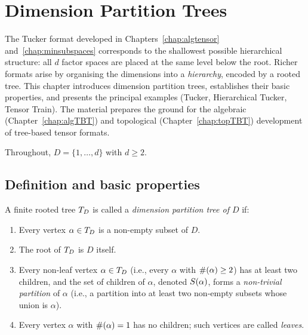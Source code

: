 %
%

\chapter{Dimension Partition Trees}
\label{chap:trees}

The Tucker format developed in Chapters~\ref{chap:algtensor}
and~\ref{chap:minsubspaces} corresponds to the shallowest possible
hierarchical structure: all $d$ factor spaces are placed at the same
level below the root. Richer formats arise by organising the dimensions
into a \emph{hierarchy}, encoded by a rooted tree. This chapter
introduces dimension partition trees, establishes their basic properties,
and presents the principal examples (Tucker, Hierarchical Tucker, Tensor
Train). The material prepares the ground for the algebraic
(Chapter~\ref{chap:algTBT}) and topological (Chapter~\ref{chap:topTBT})
development of tree-based tensor formats.

Throughout, $D = \{1, \ldots, d\}$ with $d \geq 2$.

\section{Definition and basic properties}
\label{sec:trees:def}

\begin{definition}
\label{def:partition_tree}
A finite rooted tree $T_D$ is called a \emph{dimension partition tree
of $D$} if:
\begin{enumerate}
\item[\textup{(a)}] Every vertex $\alpha \in T_D$ is a non-empty
    subset of $D$.
\item[\textup{(b)}] The root of $T_D$ is $D$ itself.
\item[\textup{(c)}] Every non-leaf vertex $\alpha \in T_D$
    (i.e., every $\alpha$ with $\#(\alpha) \geq 2$) has at
    least two children, and the set of children of $\alpha$,
    denoted $S(\alpha)$, forms a \emph{non-trivial partition}
    of $\alpha$ (i.e., a partition into at least two non-empty
    subsets whose union is $\alpha$).
\item[\textup{(d)}] Every vertex $\alpha$ with $\#(\alpha) = 1$
    has no children; such vertices are called \emph{leaves}.
\end{enumerate}
\end{definition}

